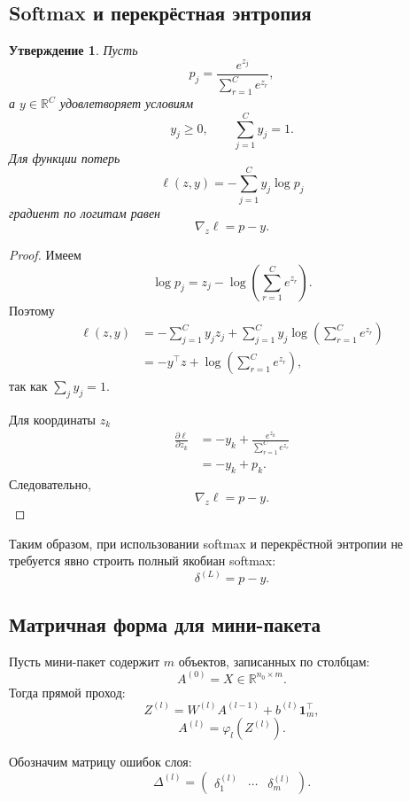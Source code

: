 \documentclass[12pt,a4paper]{article}
\theoremstyle{plain}
\newtheorem{proposition}[theorem]{Утверждение}
\theoremstyle{definition}
\theoremstyle{remark}
\newcommand{\R}{\mathbb{R}}
\begin{document}
\subsection{Softmax и перекрёстная энтропия}

\begin{proposition}
Пусть
\[
    p_j
    =
    \frac{e^{z_j}}
    {\sum_{r=1}^{C}e^{z_r}},
\]
а $y\in\R^C$ удовлетворяет условиям
\[
    y_j\geq 0,
    \qquad
    \sum_{j=1}^{C}y_j=1.
\]
Для функции потерь
\[
    \ell(z,y)
    =
    -\sum_{j=1}^{C}y_j\log p_j
\]
градиент по логитам равен
\[
    \nabla_z\ell=p-y.
\]
\end{proposition}

\begin{proof}
Имеем
\[
    \log p_j
    =
    z_j
    -
    \log
    \left(
        \sum_{r=1}^{C}e^{z_r}
    \right).
\]
Поэтому
\[
\begin{aligned}
    \ell(z,y)
    &=
    -\sum_{j=1}^{C}y_jz_j
    +
    \sum_{j=1}^{C}y_j
    \log
    \left(
        \sum_{r=1}^{C}e^{z_r}
    \right)\\
    &=
    -y^\top z
    +
    \log
    \left(
        \sum_{r=1}^{C}e^{z_r}
    \right),
\end{aligned}
\]
так как $\sum_jy_j=1$.

Для координаты $z_k$
\[
\begin{aligned}
    \frac{\partial\ell}{\partial z_k}
    &=
    -y_k
    +
    \frac{e^{z_k}}
    {\sum_{r=1}^{C}e^{z_r}}\\
    &=
    -y_k+p_k.
\end{aligned}
\]
Следовательно,
\[
    \nabla_z\ell=p-y.
\]
\end{proof}

Таким образом, при использовании softmax и перекрёстной энтропии
не требуется явно строить полный якобиан softmax:
\[
    \delta^{(L)}=p-y.
\]

\subsection{Матричная форма для мини-пакета}

Пусть мини-пакет содержит $m$ объектов, записанных по столбцам:
\[
    A^{(0)}
    =
    X
    \in\R^{n_0\times m}.
\]
Тогда прямой проход:
\[
    Z^{(l)}
    =
    W^{(l)}A^{(l-1)}
    +
    b^{(l)}\mathbf{1}_m^\top,
\]
\[
    A^{(l)}
    =
    \varphi_l(Z^{(l)}).
\]

Обозначим матрицу ошибок слоя:
\[
    \Delta^{(l)}
    =
    \begin{pmatrix}
        \delta_1^{(l)}&
        \cdots&
        \delta_m^{(l)}
    \end{pmatrix}.
\]
\end{document}
